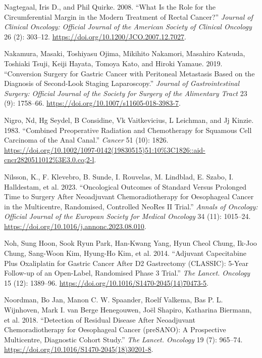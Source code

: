 \documentclass[
  letterpaper,
]{scrbook}
\newlength{\cslhangindent}
\newenvironment{CSLReferences}[2] %
 {\begin{list}{}{%
  \setlength{\itemindent}{0pt}
  \setlength{\leftmargin}{0pt}
  \setlength{\parsep}{0pt}
  \ifodd #1
   \setlength{\leftmargin}{\cslhangindent}
   \setlength{\itemindent}{-1\cslhangindent}
  \fi
  \setlength{\itemsep}{#2\baselineskip}}}
 {\end{list}}
\begin{document}
\begin{CSLReferences}{1}{0}
Nagtegaal, Iris D., and Phil Quirke. 2008. {``What Is the Role for the
Circumferential Margin in the Modern Treatment of Rectal Cancer?''}
\emph{Journal of Clinical Oncology: Official Journal of the American
Society of Clinical Oncology} 26 (2): 303--12.
\url{https://doi.org/10.1200/JCO.2007.12.7027}.

Nakamura, Masaki, Toshiyasu Ojima, Mikihito Nakamori, Masahiro Katsuda,
Toshiaki Tsuji, Keiji Hayata, Tomoya Kato, and Hiroki Yamaue. 2019.
{``Conversion {Surgery} for {Gastric} {Cancer} with {Peritoneal}
{Metastasis} {Based} on the {Diagnosis} of {Second}-{Look} {Staging}
{Laparoscopy}.''} \emph{Journal of Gastrointestinal Surgery: Official
Journal of the Society for Surgery of the Alimentary Tract} 23 (9):
1758--66. \url{https://doi.org/10.1007/s11605-018-3983-7}.

Nigro, Nd, Hg Seydel, B Considine, Vk Vaitkevicius, L Leichman, and Jj
Kinzie. 1983. {``Combined Preoperative Radiation and Chemotherapy for
Squamous Cell Carcinoma of the Anal Canal.''} \emph{Cancer} 51 (10):
1826.
\url{https://doi.org/10.1002/1097-0142(19830515)51:10\%3C1826::aid-cncr2820511012\%3E3.0.co;2-l}.

Nilsson, K., F. Klevebro, B. Sunde, I. Rouvelas, M. Lindblad, E. Szabo,
I. Halldestam, et al. 2023. {``Oncological Outcomes of Standard Versus
Prolonged Time to Surgery After Neoadjuvant Chemoradiotherapy for
Oesophageal Cancer in the Multicentre, Randomised, Controlled {NeoRes}
{II} Trial.''} \emph{Annals of Oncology: Official Journal of the
European Society for Medical Oncology} 34 (11): 1015--24.
\url{https://doi.org/10.1016/j.annonc.2023.08.010}.

Noh, Sung Hoon, Sook Ryun Park, Han-Kwang Yang, Hyun Cheol Chung, Ik-Joo
Chung, Sang-Woon Kim, Hyung-Ho Kim, et al. 2014. {``Adjuvant
Capecitabine Plus Oxaliplatin for Gastric Cancer After {D2} Gastrectomy
({CLASSIC}): 5-Year Follow-up of an Open-Label, Randomised Phase 3
Trial.''} \emph{The Lancet. Oncology} 15 (12): 1389--96.
\url{https://doi.org/10.1016/S1470-2045(14)70473-5}.

Noordman, Bo Jan, Manon C. W. Spaander, Roelf Valkema, Bas P. L.
Wijnhoven, Mark I. van Berge Henegouwen, Joël Shapiro, Katharina
Biermann, et al. 2018. {``Detection of Residual Disease After
Neoadjuvant Chemoradiotherapy for Oesophageal Cancer ({preSANO}): A
Prospective Multicentre, Diagnostic Cohort Study.''} \emph{The Lancet.
Oncology} 19 (7): 965--74.
\url{https://doi.org/10.1016/S1470-2045(18)30201-8}.


\end{CSLReferences}
\end{document}
